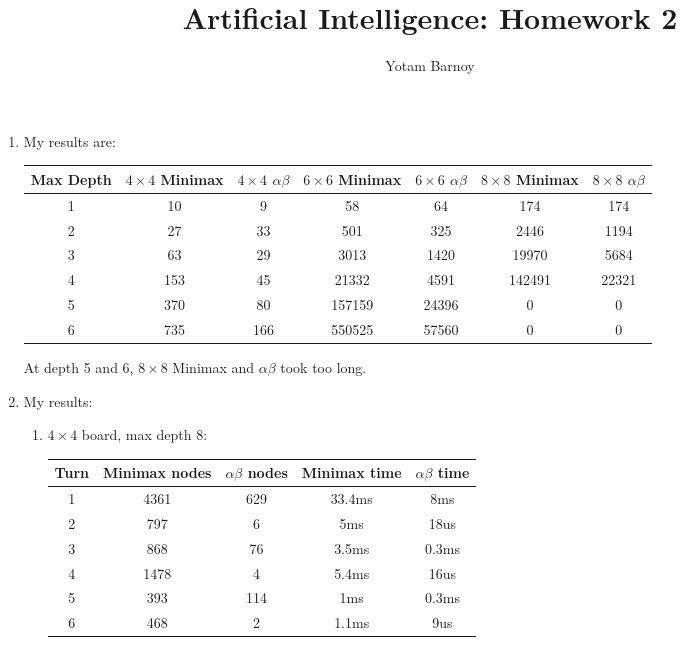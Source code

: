 \documentclass[12pt]{article}
\title{Artificial Intelligence: Homework 2}
\author{Yotam Barnoy}
\date{}
\begin{document}
\large
\maketitle
\thispagestyle{headings}

\vspace{-.5in}

\begin{enumerate}
	\item My results are:

		\begin{table}[h]
		\centering
		\begin{tabular}{|c|c|c|c|c|c|c|}
			\hline
			Max Depth & \( 4 \times 4 \) Minimax & \( 4 \times 4 \) \( \alpha \beta \) & \( 6 \times 6 \) Minimax & \( 6 \times 6 \) \( \alpha \beta \) & \( 8 \times 8 \) Minimax & \( 8 \times 8 \) \( \alpha \beta \) \\ \hline
			1 &  10  & 9   &     58 &    64 &     174 &   174 \\ \hline
			2 &  27  & 33  &    501 &   325 &    2446 &  1194 \\ \hline
			3 &  63  & 29  &   3013 &  1420 &   19970 &  5684 \\ \hline
			4 &  153 & 45  &  21332 &  4591 &  142491 & 22321 \\ \hline
			5 &  370 & 80  & 157159 & 24396 &   0     &   0   \\ \hline
			6 &  735 & 166 & 550525 & 57560 &	 	0     &   0   \\ \hline
		\end{tabular}
		\end{table}

	At depth 5 and 6, $8\times8$ Minimax and $\alpha\beta$ took too long.

\item My results:
	\begin{enumerate}	
		\item 
			$4 \times 4$ board, max depth 8: \\
	 \begin{table}[h]
		 \centering
		 \begin{tabular}{|c|c|c|c|c|}
			 \hline
			 Turn & Minimax nodes & \( \alpha\beta \) nodes & Minimax time & \( \alpha\beta \) time \\ \hline
			 1 & 4361 & 629  & 33.4ms & 8ms      \\ \hline
			 2 & 797  & 6    &  5ms   & 18us     \\ \hline
			 3 & 868  & 76   &  3.5ms & 0.3ms    \\ \hline
			 4 & 1478 & 4    & 5.4ms  & 16us     \\ \hline
			 5 & 393  & 114  & 1ms    & 0.3ms    \\ \hline
			 6 & 468  & 2    & 1.1ms  & 9us      \\ \hline


\end{tabular}
\end{table}
\end{enumerate}
\end{enumerate}
\end{document}
